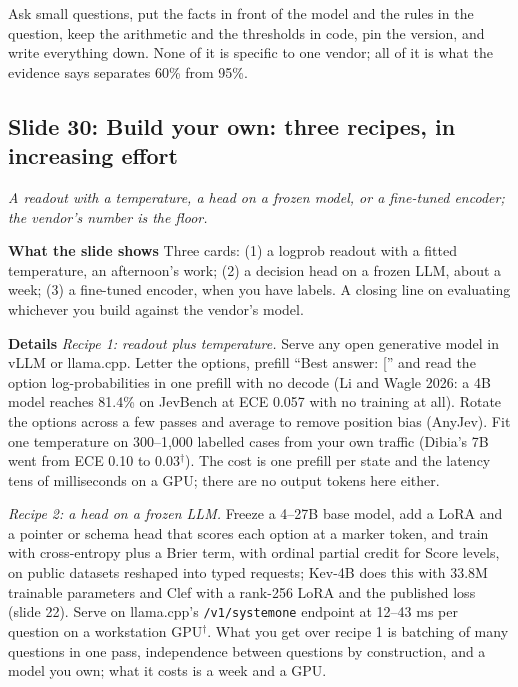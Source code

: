 \documentclass[11pt,letterpaper]{article}
\newcommand{\slide}[3]{%
  \subsection[Slide #1: #2]{Slide #1: #2}%
  {\color{muted}\itshape #3\par}\medskip}
\newcommand{\para}[1]{\medskip\noindent\textbf{#1}\quad}
\newenvironment{intuition}{\begin{tcolorbox}[intuitionbox]}{\end{tcolorbox}}
\begin{document}
\begin{intuition}
Ask small questions, put the facts in front of the model and the rules in the question, keep the arithmetic and the thresholds in code, pin the version, and write everything down. None of it is specific to one vendor; all of it is what the evidence says separates 60\% from 95\%.
\end{intuition}

\slide{30}{Build your own: three recipes, in increasing effort}{A readout with a temperature, a head on a frozen model, or a fine-tuned encoder; the vendor's number is the floor.}

\para{What the slide shows} Three cards: (1) a logprob readout with a fitted temperature, an afternoon's work; (2) a decision head on a frozen LLM, about a week; (3) a fine-tuned encoder, when you have labels. A closing line on evaluating whichever you build against the vendor's model.

\para{Details} \emph{Recipe 1: readout plus temperature.} Serve any open generative model in vLLM or llama.cpp. Letter the options, prefill ``Best answer: ['' and read the option log-probabilities in one prefill with no decode (Li and Wagle 2026: a 4B model reaches 81.4\% on JevBench at ECE 0.057 with no training at all). Rotate the options across a few passes and average to remove position bias (AnyJev). Fit one temperature on 300--1,000 labelled cases from your own traffic (Dibia's 7B went from ECE 0.10 to 0.03$^\dagger$). The cost is one prefill per state and the latency tens of milliseconds on a GPU; there are no output tokens here either.

\emph{Recipe 2: a head on a frozen LLM.} Freeze a 4--27B base model, add a LoRA and a pointer or schema head that scores each option at a marker token, and train with cross-entropy plus a Brier term, with ordinal partial credit for Score levels, on public datasets reshaped into typed requests; Kev-4B does this with 33.8M trainable parameters and Clef with a rank-256 LoRA and the published loss (slide 22). Serve on llama.cpp's \texttt{/v1/systemone} endpoint at 12--43 ms per question on a workstation GPU$^\dagger$. What you get over recipe 1 is batching of many questions in one pass, independence between questions by construction, and a model you own; what it costs is a week and a GPU.
\end{document}

